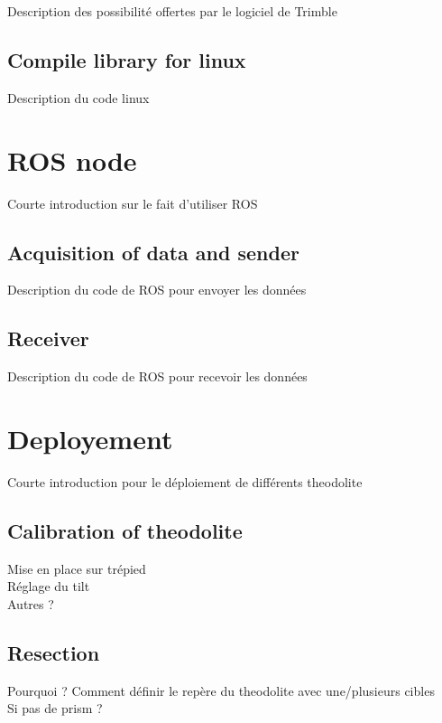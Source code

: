 \documentclass[10pt,letterpaper,oneside]{article}
\begin{document}
Description des possibilité offertes par le logiciel de Trimble

\subsection{Compile library for linux}

Description du code linux

\section{ROS node}

Courte introduction sur le fait d'utiliser ROS

\subsection{Acquisition of data and sender}

Description du code de ROS pour envoyer les données

\subsection{Receiver}

Description du code de ROS pour recevoir les données

\section{Deployement}

Courte introduction pour le déploiement de différents theodolite

\subsection{Calibration of theodolite}

Mise en place sur trépied \\
Réglage du tilt \\
Autres ? \\

\subsection{Resection}

Pourquoi ?
Comment définir le repère du theodolite avec une/plusieurs cibles \\
Si pas de prism ? \\
\end{document}

